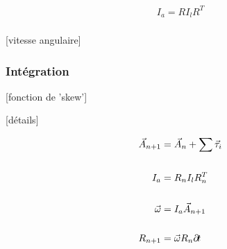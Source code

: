 \begin{align*}
  I_a = R I_l R^T \\
\end{align*}

[vitesse angulaire]

\subsubsection{Intégration}

[fonction de 'skew']

[détails]

\begin{align*}
  \vec{A}_{n+1} &= \vec{A}_n + \sum \vec{\tau}_i \\ \\
  I_a &= R_n I_l R_n^T \\ \\
  \vec{\omega} &= I_a \vec{A}_{n+1} \\ \\
  R_{n+1} &= \vec{\omega} R_n \partial \! t \\
\end{align*}
